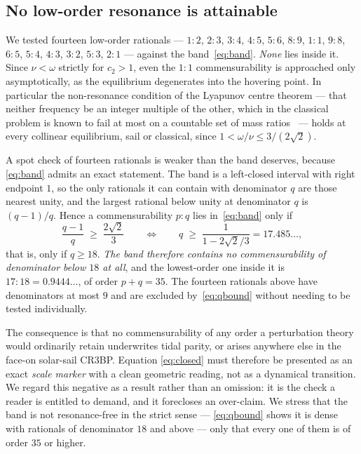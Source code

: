 \documentclass[pdflatex,sn-mathphys-num]{sn-jnl}
\begin{document}
\subsection{No low-order resonance is attainable}

We tested fourteen low-order rationals --- $1{:}2$, $2{:}3$, $3{:}4$, $4{:}5$,
$5{:}6$, $8{:}9$, $1{:}1$, $9{:}8$, $6{:}5$, $5{:}4$, $4{:}3$, $3{:}2$,
$5{:}3$, $2{:}1$ --- against the band~\eqref{eq:band}. \emph{None} lies inside
it. Since $\nu<\omega$ strictly for $c_2>1$, even the $1{:}1$ commensurability is
approached only asymptotically, as the equilibrium degenerates into the hovering
point. In particular the non-resonance condition of the Lyapunov centre
theorem --- that neither frequency be an integer multiple of the other, which
in the classical problem is known to fail at most on a countable set of mass
ratios~\cite{gomez2001} --- holds at every collinear equilibrium, sail or
classical, since $1<\omega/\nu\leq3/(2\sqrt2)$.

A spot check of fourteen rationals is weaker than the band deserves, because
\eqref{eq:band} admits an exact statement. The band is a left-closed interval
with right endpoint $1$, so the only rationals it can contain with denominator
$q$ are those nearest unity, and the largest rational below unity at
denominator $q$ is $(q-1)/q$. Hence a commensurability $p{:}q$ lies
in~\eqref{eq:band} only if
\begin{equation}
  \frac{q-1}{q} \;\geq\; \frac{2\sqrt2}{3}
  \qquad\Longleftrightarrow\qquad
  q \;\geq\; \frac{1}{1-2\sqrt2/3} = 17.485\ldots ,
  \label{eq:qbound}
\end{equation}
that is, only if $q\geq18$. \emph{The band therefore contains no commensurability
of denominator below $18$ at all}, and the lowest-order one inside it is
$17{:}18=0.9444\ldots$, of order $p+q=35$. The fourteen rationals above have
denominators at most $9$ and are excluded by~\eqref{eq:qbound} without needing
to be tested individually.

The consequence is that no commensurability of any order a perturbation theory
would ordinarily retain underwrites tidal parity, or arises anywhere else in the
face-on solar-sail CR3BP. Equation
\eqref{eq:closed} must therefore be presented as an exact \emph{scale marker}
with a clean geometric reading, not as a dynamical transition. We regard this
negative as a result rather than an omission: it is the check a reader is
entitled to demand, and it forecloses an over-claim. We stress that the band is
not resonance-free in the strict sense --- \eqref{eq:qbound} shows it is dense
with rationals of denominator $18$ and above --- only that every one of them is
of order $35$ or higher.
\end{document}
